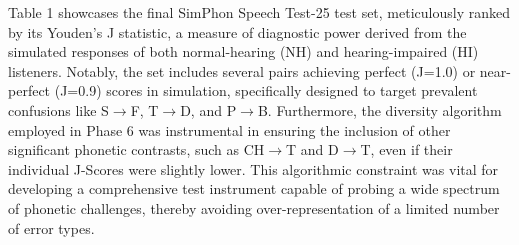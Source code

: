 \documentclass{article}
\begin{document}
Table 1 showcases the final SimPhon Speech Test-25 test set, meticulously ranked by its Youden's J statistic, a measure of diagnostic power derived from the simulated responses of both normal-hearing (NH) and hearing-impaired (HI) listeners. Notably, the set includes several pairs achieving perfect (J=1.0) or near-perfect (J=0.9) scores in simulation, specifically designed to target prevalent confusions like S$\rightarrow$F, T$\rightarrow$D, and P$\rightarrow$B. Furthermore, the diversity algorithm employed in Phase 6 was instrumental in ensuring the inclusion of other significant phonetic contrasts, such as CH$\rightarrow$T and D$\rightarrow$T, even if their individual J-Scores were slightly lower. This algorithmic constraint was vital for developing a comprehensive test instrument capable of probing a wide spectrum of phonetic challenges, thereby avoiding over-representation of a limited number of error types.
\end{document}

